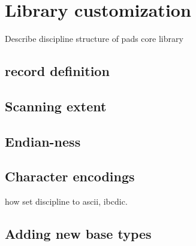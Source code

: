 \chapter{Library customization}
\label{chap:library-customization}
Describe discipline structure of pads core library
\section{record definition}

\section{Scanning extent}
\label{sec:library-customization-scanning-extent}

\section{Endian-ness}
\label{sec:library-customization-endian}

\section{Character encodings}
\label{sec:library-customization-character-encodings}
how set discipline to ascii, ibcdic.

\section{Adding new base types}
